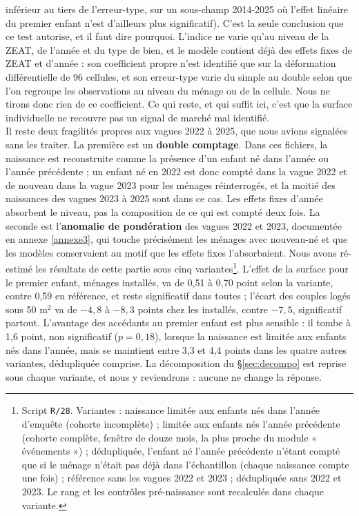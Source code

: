\documentclass[12pt,a4paper]{article}
\begin{document}
inférieur au tiers de l'erreur-type, sur un sous-champ 2014-2025 où l'effet linéaire du premier enfant n'est d'ailleurs plus significatif). C'est la seule conclusion que ce test autorise, et il faut dire pourquoi. L'indice ne varie qu'au niveau de la ZEAT, de l'année et du type de bien, et le modèle contient déjà des effets fixes de ZEAT et d'année : son coefficient propre n'est identifié que sur la déformation différentielle de 96 cellules, et son erreur-type varie du simple au double selon que l'on regroupe les observations au niveau du ménage ou de la cellule. Nous ne tirons donc rien de ce coefficient. Ce qui reste, et qui suffit ici, c'est que la surface individuelle ne recouvre pas un signal de marché mal identifié. \\

\noindent Il reste deux fragilités propres aux vagues 2022 à 2025, que nous avions signalées sans les traiter. La première est un \textbf{double comptage}. Dans ces fichiers, la naissance est reconstruite comme la présence d'un enfant né dans l'année ou l'année précédente ; un enfant né en 2022 est donc compté dans la vague 2022 et de nouveau dans la vague 2023 pour les ménages réinterrogés, et la moitié des naissances des vagues 2023 à 2025 sont dans ce cas. Les effets fixes d'année absorbent le niveau, pas la composition de ce qui est compté deux fois. La seconde est l'\textbf{anomalie de pondération} des vagues 2022 et 2023, documentée en annexe \ref{annexe3}, qui touche précisément les ménages avec nouveau-né et que les modèles conservaient au motif que les effets fixes l'absorbaient. Nous avons ré-estimé les résultats de cette partie sous cinq variantes\footnote{Script \texttt{R/28}. Variantes : naissance limitée aux enfants nés dans l'année d'enquête (cohorte incomplète) ; limitée aux enfants nés l'année précédente (cohorte complète, fenêtre de douze mois, la plus proche du module « événements ») ; dédupliquée, l'enfant né l'année précédente n'étant compté que si le ménage n'était pas déjà dans l'échantillon (chaque naissance compte une fois) ; référence sans les vagues 2022 et 2023 ; dédupliquée sans 2022 et 2023. Le rang et les contrôles pré-naissance sont recalculés dans chaque variante.}. L'effet de la surface pour le premier enfant, ménages installés, va de 0,51 à 0,70 point selon la variante, contre 0,59 en référence, et reste significatif dans toutes ; l'écart des couples logés sous 50 m$^2$ va de $-4{,}8$ à $-8{,}3$ points chez les installés, contre $-7{,}5$, significatif partout. L'avantage des accédants au premier enfant est plus sensible : il tombe à 1,6 point, non significatif ($p = 0{,}18$), lorsque la naissance est limitée aux enfants nés dans l'année, mais se maintient entre 3,3 et 4,4 points dans les quatre autres variantes, dédupliquée comprise. La décomposition du §\ref{sec:decompo} est reprise sous chaque variante, et nous y reviendrons : aucune ne change la réponse.
\end{document}
